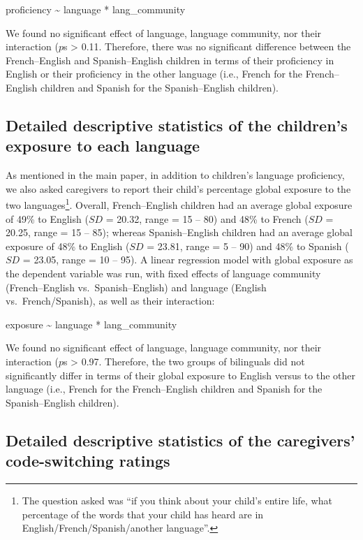 \documentclass[
  man,floatsintext]{apa7}
\begin{document}
proficiency \textasciitilde{} language * lang\_community

\noindent We found no significant effect of language, language community, nor their interaction (\(p\)s \textgreater{} 0.11. Therefore, there was no significant difference between the French--English and Spanish--English children in terms of their proficiency in English or their proficiency in the other language (i.e., French for the French--English children and Spanish for the Spanish--English children).

\hypertarget{detailed-descriptive-statistics-of-the-childrens-exposure-to-each-language}{%
\subsection{Detailed descriptive statistics of the children's exposure to each language}\label{detailed-descriptive-statistics-of-the-childrens-exposure-to-each-language}}

As mentioned in the main paper, in addition to children's language proficiency, we also asked caregivers to report their child's percentage global exposure to the two languages\footnote{The question asked was ``if you think about your child's entire life, what percentage of the words that your child has heard are in English/French/Spanish/another language''.}. Overall, French--English children had an average global exposure of 49\% to English (\(SD\) = 20.32, range = 15 -- 80) and 48\% to French (\(SD\) = 20.25, range = 15 -- 85); whereas Spanish--English children had an average global exposure of 48\% to English (\(SD\) = 23.81, range = 5 -- 90) and 48\% to Spanish (\(SD\) = 23.05, range = 10 -- 95). A linear regression model with global exposure as the dependent variable was run, with fixed effects of language community (French--English vs.~Spanish--English) and language (English vs.~French/Spanish), as well as their interaction:

exposure \textasciitilde{} language * lang\_community

\noindent We found no significant effect of language, language community, nor their interaction (\(p\)s \textgreater{} 0.97. Therefore, the two groups of bilinguals did not significantly differ in terms of their global exposure to English versus to the other language (i.e., French for the French--English children and Spanish for the Spanish--English children).

\hypertarget{detailed-descriptive-statistics-of-the-caregivers-code-switching-ratings}{%
\subsection{Detailed descriptive statistics of the caregivers' code-switching ratings}\label{detailed-descriptive-statistics-of-the-caregivers-code-switching-ratings}}
\end{document}
